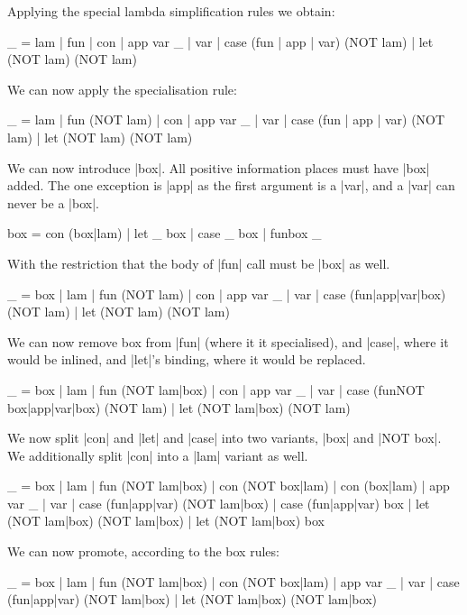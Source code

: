 \documentclass[preprint]{sigplanconf}
\begin{document}
Applying the special lambda simplification rules we obtain:

\begin{code}
_ = lam | fun | con | app var  _ | var | case (fun | app | var) (NOT lam) | let (NOT lam) (NOT lam)
\end{code}

We can now apply the specialisation rule:

\begin{code}
_ = lam | fun (NOT lam) | con | app var  _ | var | case (fun | app | var) (NOT lam) | let (NOT lam) (NOT lam)
\end{code}

We can now introduce |box|. All positive information places must have |box| added. The one exception is |app| as the first argument is a |var|, and a |var| can never be a |box|.

\begin{code}
box = con (box|lam) | let _ box | case _ box | fun{box} _
\end{code}

With the restriction that the body of |fun| call must be |box| as well.


\begin{code}
_ = box | lam | fun (NOT lam) | con | app var  _ | var | case (fun|app|var|box) (NOT lam) | let (NOT lam) (NOT lam)
\end{code}

We can now remove box from |fun| (where it it specialised), and |case|, where it would be inlined, and |let|'s binding, where it would be replaced.

\begin{code}
_ = box | lam | fun (NOT lam|box) | con | app var  _ | var | case (fun{NOT box}|app|var|box) (NOT lam) | let (NOT lam|box) (NOT lam)
\end{code}

We now split |con| and |let| and |case| into two variants, |box| and |NOT box|. We additionally split |con| into a |lam| variant as well.

\begin{code}
_ = box | lam | fun (NOT lam|box) | con (NOT box|lam) | con (box|lam) | app var  _ | var | case (fun|app|var) (NOT lam|box) | case (fun|app|var) box | let (NOT lam|box) (NOT lam|box) | let (NOT lam|box) box
\end{code}

We can now promote, according to the box rules:

\begin{code}
_ = box | lam | fun (NOT lam|box) | con (NOT box|lam) | app var  _ | var | case (fun|app|var) (NOT lam|box) | let (NOT lam|box) (NOT lam|box)
\end{code}
\end{document}
